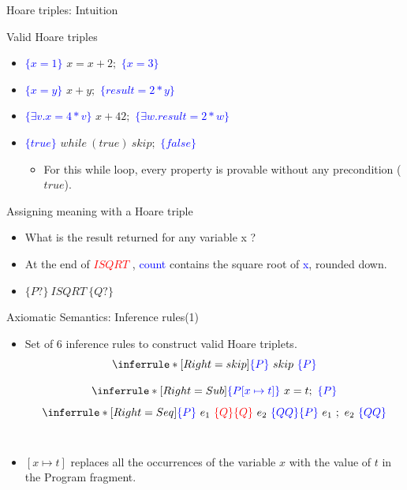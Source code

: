 \begin{frame}{Hoare triples: Intuition}
\begin{exampleblock}{Valid Hoare triples}
	\begin{itemize}
		\item \textcolor{blue}{$\{ x = 1 \}$} $x = x + 2;$ \textcolor{blue}{$\{ x = 3 \}$}
		\item \textcolor{blue}{$\{ x = y \}$} $ x + y;$ \textcolor{blue}{$\{ result = 2 * y \}$}
		\item \textcolor{blue}{$\{ \exists v. x = 4 * v \}$} $ x + 42;$ \textcolor{blue}{$\{ \exists w.result = 2 * w \}$}
		\pause
		\item \textcolor{blue}{$\{ true\}$} $ while~(true)~ skip;$ \textcolor{blue}{$\{ false \}$}
		\begin{itemize}
			\item For this while loop, every property is provable without any precondition ($true$).
		\end{itemize}		
	\end{itemize}
\end{exampleblock}
\end{frame}
\begin{frame}{Assigning meaning with a Hoare triple}
\begin{exampleblock}
	
	\begin{itemize}
		\item What is the result returned for any variable x ?
		
		\item At the end of \textcolor{red}{$ISQRT$  }, \textcolor{blue}{count} contains the square root of \textcolor{blue}{x}, rounded down.
		\item $\{ P? \} ~ ISQRT ~ \{ Q? \} $
	
	\end{itemize} 
\end{exampleblock}
\end{frame}

\begin{frame}{Axiomatic Semantics: Inference rules(1)}
\begin{itemize}
\item Set of 6 inference rules to construct valid Hoare triplets.
$$
\inferrule*[Right=skip]
{ }{\color{blue}\{P\}~\color{black}skip~\color{blue}\{P\}}
$$

$$
\inferrule*[Right=Sub]
{ } {\color{blue}\{P [x \mapsto t]\}~\color{black}x = t;~\color{blue}\{P\}}
$$
$$
\inferrule*[Right=Seq]
{\color{blue}\{P\}~\color{black}e_1~\color{red}{\{Q\}} \\ \color{red}{\{Q\}}~\color{black}e_2~\color{blue}\{QQ\} }{\color{blue}\{P\} ~\color{black}e_1~;~e_2~ \color{blue}\{QQ\}}
$$\\
\item $[x \mapsto t]$ replaces all the occurrences of the variable $x$ with the value of $t$ in the Program fragment.
\end{itemize}
\end{frame}


